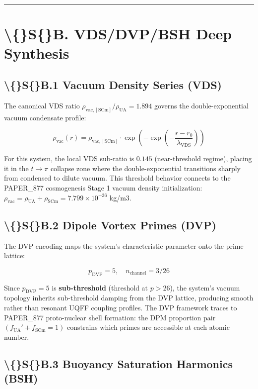 \documentclass[11pt]{article}
\begin{document}
\noindent\rule{\textwidth}{0.4pt}

\section*{\textbackslash\{\}S\{\}B. VDS/DVP/BSH Deep Synthesis}

\subsection*{\textbackslash\{\}S\{\}B.1 Vacuum Density Series (VDS)}

The canonical VDS ratio $\rho_{\mathrm{vac,[SCm]}} / \rho_{\mathrm{UA}} = 1.894$ governs the double-exponential vacuum condensate profile:

$$\rho_{\mathrm{vac}}(r) = \rho_{\mathrm{vac,[SCm]}} \cdot \exp\!\left(-\exp\!\left(-\frac{r - r_0}{\lambda_{\mathrm{VDS}}}\right)\right)$$

For this system, the local VDS sub-ratio is $0.145$ (near-threshold regime), placing it in the $t \to \pi$ collapse zone where the double-exponential transitions sharply from condensed to dilute vacuum. This threshold behavior connects to the PAPER\_877 cosmogenesis Stage 1 vacuum density initialization: $\rho_{\mathrm{vac}} = \rho_{\mathrm{UA}} + \rho_{\mathrm{SCm}} = 7.799 \times 10^{-36}$ kg/m3.

\subsection*{\textbackslash\{\}S\{\}B.2 Dipole Vortex Primes (DVP)}

The DVP encoding maps the system's characteristic parameter onto the prime lattice:

$$p_{\mathrm{DVP}} = 5, \quad n_{\mathrm{channel}} = 3/26$$

Since $p_{\mathrm{DVP}} = 5$ is \textbf{sub-threshold} (threshold at $p > 26$), the system's vacuum topology inherits sub-threshold damping from the DVP lattice, producing smooth rather than resonant UQFF coupling profiles. The DVP framework traces to PAPER\_877 proto-nuclear shell formation: the DPM proportion pair $(f_{\mathrm{UA}}' + f_{\mathrm{SCm}} = 1)$ constrains which primes are accessible at each atomic number.

\subsection*{\textbackslash\{\}S\{\}B.3 Buoyancy Saturation Harmonics (BSH)}
\end{document}
